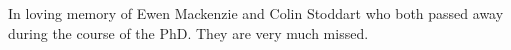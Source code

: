 \begin{dedication}
In loving memory of Ewen Mackenzie and Colin Stoddart who both passed away during the course of the PhD. They are very much missed.  
\end{dedication}